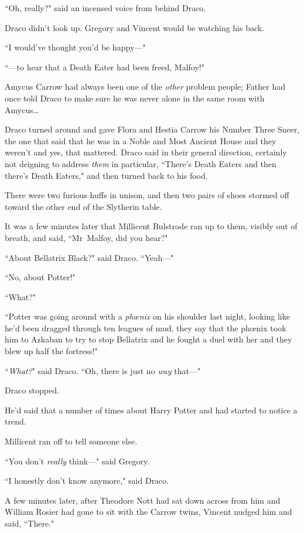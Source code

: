 ``Oh, really?" said an incensed voice from behind Draco.

Draco didn't look up. Gregory and Vincent would be watching his back.

``I would've thought you'd be happy—"

``—to hear that a Death Eater had been freed, Malfoy!"

Amycus Carrow had always been one of the \emph{other} problem people; Father had once told Draco to make sure he was never alone in the same room with Amycus{\ldots}

Draco turned around and gave Flora and Hestia Carrow his Number Three Sneer, the one that said that he was in a Noble and Most Ancient House and they weren't and yes, that mattered. Draco said in their general direction, certainly not deigning to address \emph{them} in particular, ``There's Death Eaters and then there's Death Eaters," and then turned back to his food.

There were two furious huffs in unison, and then two pairs of shoes stormed off toward the other end of the Slytherin table.

It was a few minutes later that Millicent Bulstrode ran up to them, visibly out of breath, and said, ``Mr~Malfoy, did you hear?"

``About Bellatrix Black?" said Draco. ``Yeah—"

``No, about Potter!"

``What?"

``Potter was going around with a \emph{phœnix} on his shoulder last night, looking like he'd been dragged through ten leagues of mud, they say that the phœnix took him to Azkaban to try to stop Bellatrix and he fought a duel with her and they blew up half the fortress!"

``\emph{What?}" said Draco. ``Oh, there is just no \emph{way} that—"

Draco stopped.

He'd said that a number of times about Harry Potter and had started to notice a trend.

Millicent ran off to tell someone else.

``You don't \emph{really} think—" said Gregory.

``I honestly don't know anymore," said Draco.

A few minutes later, after Theodore Nott had sat down across from him and William Rosier had gone to sit with the Carrow twins, Vincent nudged him and said, ``There."

